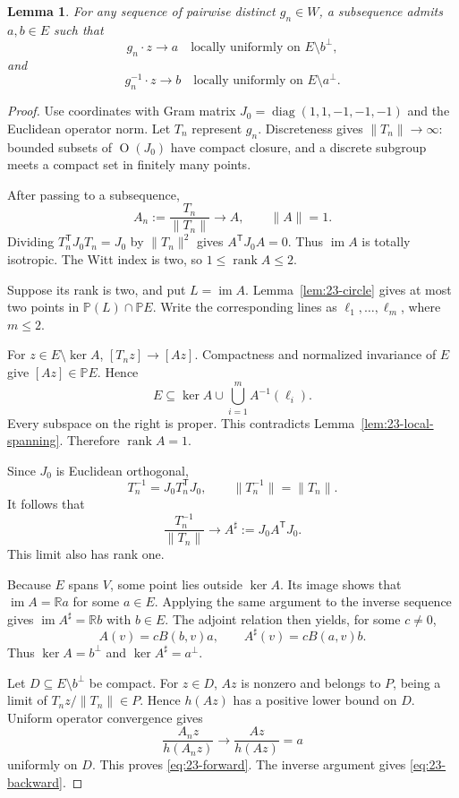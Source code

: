 \documentclass[11pt,reqno]{amsart}
\newcommand{\R}{\mathbb{R}}
\theoremstyle{plain}
\newtheorem{lemma}[theorem]{Lemma}
\theoremstyle{definition}
\theoremstyle{remark}
\numberwithin{equation}{section}
\begin{document}
\begin{lemma}\label{lem:23-rank-one}
For any sequence of pairwise distinct $g_n\in W$, a subsequence admits $a,b\in E$ such that
\begin{equation}\label{eq:23-forward}
g_n\cdot z\longrightarrow a
\quad\text{locally uniformly on }E\setminus b^\perp,
\end{equation}
and
\begin{equation}\label{eq:23-backward}
g_n^{-1}\cdot z\longrightarrow b
\quad\text{locally uniformly on }E\setminus a^\perp.
\end{equation}
\end{lemma}
\begin{proof}
Use coordinates with Gram matrix $J_0=\operatorname{diag}(1,1,-1,-1,-1)$ and the Euclidean operator norm. Let $T_n$ represent $g_n$. Discreteness gives $\|T_n\|\to\infty$: bounded subsets of $\operatorname{O}(J_0)$ have compact closure, and a discrete subgroup meets a compact set in finitely many points.

After passing to a subsequence,
\[
A_n:=\frac{T_n}{\|T_n\|}\longrightarrow A,\qquad\|A\|=1.
\]
Dividing $T_n^{\mathsf T}J_0T_n=J_0$ by $\|T_n\|^2$ gives $A^{\mathsf T}J_0A=0$. Thus $\operatorname{im}A$ is totally isotropic. The Witt index is two, so $1\leq\operatorname{rank}A\leq2$.

Suppose its rank is two, and put $L=\operatorname{im}A$. Lemma~\ref{lem:23-circle} gives at most two points in $\mathbb P(L)\cap\mathbb P E$. Write the corresponding lines as $\ell_1,\ldots,\ell_m$, where $m\leq2$.

For $z\in E\setminus\ker A$, $[T_nz]\to[Az]$. Compactness and normalized invariance of $E$ give $[Az]\in\mathbb P E$. Hence
\[
E\subseteq\ker A\cup\bigcup_{i=1}^m A^{-1}(\ell_i).
\]
Every subspace on the right is proper. This contradicts Lemma~\ref{lem:23-local-spanning}. Therefore $\operatorname{rank}A=1$.

Since $J_0$ is Euclidean orthogonal,
\[
T_n^{-1}=J_0T_n^{\mathsf T}J_0,\qquad\|T_n^{-1}\|=\|T_n\|.
\]
It follows that
\[
\frac{T_n^{-1}}{\|T_n\|}\longrightarrow A^\sharp:=J_0A^{\mathsf T}J_0.
\]
This limit also has rank one.

Because $E$ spans $V$, some point lies outside $\ker A$. Its image shows that $\operatorname{im}A=\R a$ for some $a\in E$. Applying the same argument to the inverse sequence gives $\operatorname{im}A^\sharp=\R b$ with $b\in E$. The adjoint relation then yields, for some $c\neq0$,
\begin{equation}\label{eq:23-rank-one-form}
A(v)=cB(b,v)a,\qquad A^\sharp(v)=cB(a,v)b.
\end{equation}
Thus $\ker A=b^\perp$ and $\ker A^\sharp=a^\perp$.

Let $D\subseteq E\setminus b^\perp$ be compact. For $z\in D$, $Az$ is nonzero and belongs to $P$, being a limit of $T_nz/\|T_n\|\in P$. Hence $h(Az)$ has a positive lower bound on $D$. Uniform operator convergence gives
\[
\frac{A_nz}{h(A_nz)}\longrightarrow\frac{Az}{h(Az)}=a
\]
uniformly on $D$. This proves \eqref{eq:23-forward}. The inverse argument gives \eqref{eq:23-backward}.
\end{proof}
\end{document}
